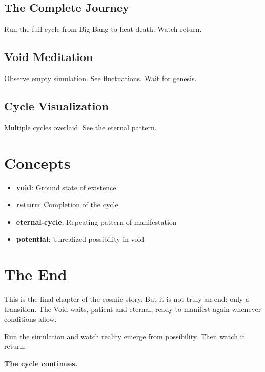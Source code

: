 \documentclass[
  11pt,
  letterpaper,
  twoside,
  openright]{book}
\providecommand{\tightlist}{%
  \setlength{\itemsep}{0pt}\setlength{\parskip}{0pt}}
\begin{document}
\subsection{The Complete Journey}\label{the-complete-journey}

Run the full cycle from Big Bang to heat death. Watch return.

\subsection{Void Meditation}\label{void-meditation}

Observe empty simulation. See fluctuations. Wait for genesis.

\subsection{Cycle Visualization}\label{cycle-visualization}

Multiple cycles overlaid. See the eternal pattern.

\section{Concepts}\label{concepts-44}

\begin{itemize}
\tightlist
\item
  \textbf{void}: Ground state of existence
\item
  \textbf{return}: Completion of the cycle
\item
  \textbf{eternal-cycle}: Repeating pattern of manifestation
\item
  \textbf{potential}: Unrealized possibility in void
\end{itemize}

\section{The End}\label{the-end-1}

This is the final chapter of the cosmic story. But it is not truly an
end: only a transition. The Void waits, patient and eternal, ready to
manifest again whenever conditions allow.

Run the simulation and watch reality emerge from possibility. Then watch
it return.

\textbf{The cycle continues.}
\end{document}
